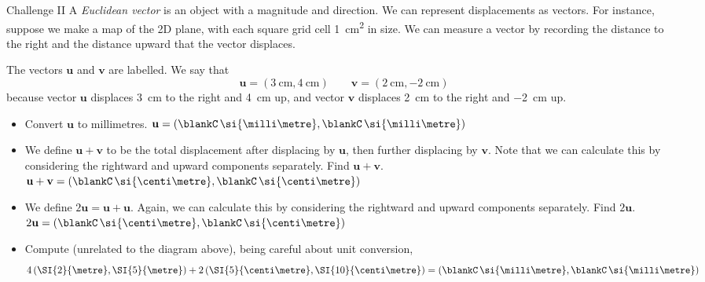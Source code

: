 \documentclass[14pt,letterpaper]{article}
\begin{document}
\begin{problem}{Challenge II}
  A \emph{Euclidean vector} is an object with a magnitude and direction. We can
  represent displacements as vectors. For instance, suppose we make a map of
  the 2D plane, with each square grid cell \SI{1}{\centi\metre\squared} in
  size. We can measure a vector by recording the distance to the right and the
  distance upward that the vector displaces.

  \begin{center}
  \end{center}

  The vectors \(\mathbf{u}\) and \(\mathbf{v}\) are labelled. We say that \[
    \mathbf{u} = \left( \SI{3}{\centi\metre}, \SI{4}{\centi\metre} \right)
    \hspace{2em}
    \mathbf{v} = \left( \SI{2}{\centi\metre}, \SI{-2}{\centi\metre} \right)
  \] because vector \(\mathbf{u}\) displaces \SI{3}{\centi\metre} to the right
  and \SI{4}{\centi\metre} up, and vector \(\mathbf{v}\) displaces
  \SI{2}{\centi\metre} to the right and \SI{-2}{\centi\metre} up.

  \begin{itemize}
    \item Convert \(\mathbf{u}\) to millimetres. \hfill
    \(\mathbf{u} = \left(
    \blankC\,\si{\milli\metre}, \blankC\,\si{\milli\metre} \right)\)
    \item We define \(\mathbf{u} + \mathbf{v}\) to be the total displacement
    after displacing by \(\mathbf{u}\), then further displacing by
    \(\mathbf{v}\). Note that we can calculate this by considering the
    rightward and upward components separately. Find \(\mathbf{u} +
    \mathbf{v}\). \hfill \(\mathbf{u} + \mathbf{v} = \left(
    \blankC\,\si{\centi\metre}, \blankC\,\si{\centi\metre} \right)\)
    \item We define \(2\mathbf{u} = \mathbf{u} + \mathbf{u}\). Again, we can
    calculate this by considering the rightward and upward components
    separately. Find \(2\mathbf{u}\). \hfill \(2\mathbf{u} = \left(
    \blankC\,\si{\centi\metre}, \blankC\,\si{\centi\metre} \right)\)
    \item Compute (unrelated to the diagram above), being careful about unit
    conversion, \[
      4\left( \SI{2}{\metre}, \SI{5}{\metre} \right) +
      2\left( \SI{5}{\centi\metre}, \SI{10}{\centi\metre} \right)
      = \left( \blankC\,\si{\milli\metre}, \blankC\,\si{\milli\metre} \right)
    \]
  \end{itemize}
\end{problem}
\end{document}
